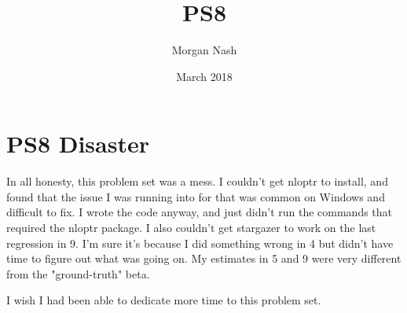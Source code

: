 \documentclass{article}
\title{PS8}
\author{Morgan Nash}
\date{March 2018}
\begin{document}
\maketitle

\section{PS8 Disaster}
In all honesty, this problem set was a mess. I couldn't get nloptr to install, and found that the issue I was running into for that was common on Windows and difficult to fix. I wrote the code anyway, and just didn't run the commands that required the nloptr package. I also couldn't get stargazer to work on the last regression in 9. I'm sure it's because I did something wrong in 4 but didn't have time to figure out what was going on. My estimates in 5 and 9 were very different from the "ground-truth" beta.

I wish I had been able to dedicate more time to this problem set.
\end{document}

